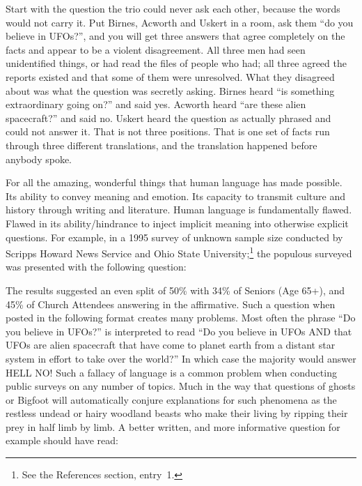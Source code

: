 Start with the question the trio could never ask each other, because the words would not carry it.
Put Birnes, Acworth and Uskert in a room, ask them ``do you believe in UFOs?'', and you will get
three answers that agree completely on the facts and appear to be a violent disagreement. All
three men had seen unidentified things, or had read the files of people who had; all three agreed
the reports existed and that some of them were unresolved. What they disagreed about was what the
question was secretly asking. Birnes heard ``is something extraordinary going on?'' and said yes.
Acworth heard ``are these alien spacecraft?'' and said no. Uskert heard the question as actually
phrased and could not answer it. That is not three positions. That is one set of facts run
through three different translations, and the translation happened before anybody spoke.

For all the amazing, wonderful things that human language has made possible.
Its ability to convey meaning and emotion. Its capacity to transmit culture and
history through writing and literature. Human language is fundamentally flawed.
Flawed in its ability/hindrance to inject implicit meaning into otherwise
explicit questions. For example, in a 1995 survey of unknown sample size
conducted by Scripps Howard News Service and Ohio State University;\footnote{See
the References section, entry~1.} the populous surveyed was presented with the
following question:


The results suggested an even split of 50\% with 34\% of Seniors (Age 65+),
and 45\% of Church Attendees answering in the affirmative. Such a question when
posted in the following format creates many problems. Most often the phrase
``Do you believe in UFOs?'' is interpreted to read ``Do you believe in UFOs AND
that UFOs are alien spacecraft that have come to planet earth from a distant
star system in effort to take over the world?'' In which case the majority would
answer HELL NO! Such a fallacy of language is a common problem when conducting
public surveys on any number of topics. Much in the way that questions of ghosts
or Bigfoot will automatically conjure explanations for such phenomena as the
restless undead or hairy woodland beasts who make their living by ripping their
prey in half limb by limb. A better written, and more informative question for
example should have read:


